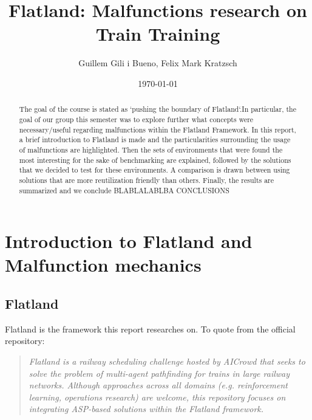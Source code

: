 \documentclass{llncs}
\begin{document}
\title{Flatland: Malfunctions research on Train Training}
\author{Guillem Gili i Bueno, Felix Mark Kratzsch}
\date{\today}
\maketitle


\begin{abstract}
The goal of the course is stated as `pushing the boundary of Flatland`.In particular, the goal of our group this semester was to explore further what concepts were necessary/useful regarding malfunctions within the Flatland Framework. In this report, a brief introduction to Flatland is made and the particularities surrounding the usage of malfunctions are highlighted. Then the sets of environments that were found the most interesting for the sake of benchmarking are explained, followed by the solutions that we decided to test for these environments. A comparison is drawn between using solutions that are more reutilization friendly than others. Finally, the results are summarized and  we conclude 
\color{green} BLABLALABLBA CONCLUSIONS \color{black}

\end{abstract}

\setcounter{tocdepth}{4}
\tableofcontents


\section{Introduction to Flatland and Malfunction mechanics}

\subsection{Flatland}
Flatland\cite{flatland} is the framework this report researches on. To quote from the official repository:
\begin{quote}
\emph{	Flatland is a railway scheduling challenge hosted by AICrowd that seeks to solve the problem of multi-agent pathfinding for trains in large railway networks. Although approaches across all domains (e.g. reinforcement learning, operations research) are welcome, this repository focuses on integrating ASP-based solutions within the Flatland framework.}
\end{quote}
\end{document}
